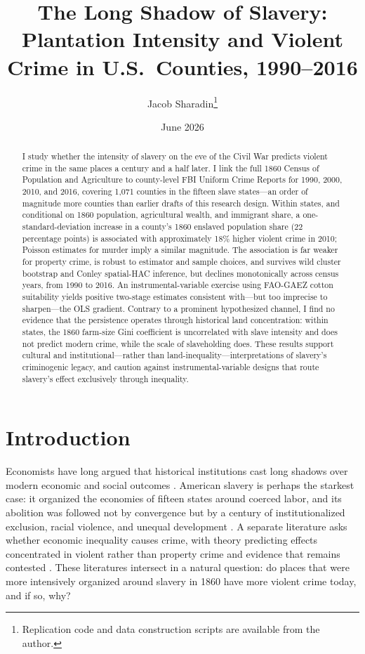 \documentclass[12pt]{article}
\title{\textbf{The Long Shadow of Slavery: Plantation Intensity and Violent Crime in U.S.\ Counties, 1990--2016}\\[0.6em]
\large}
\author{Jacob Sharadin\thanks{Replication code and data construction scripts are available from the author.}}
\date{June 2026}
\begin{document}
\maketitle

\begin{abstract}
\noindent I study whether the intensity of slavery on the eve of the Civil War predicts violent crime in the same places a century and a half later. I link the full 1860 Census of Population and Agriculture to county-level FBI Uniform Crime Reports for 1990, 2000, 2010, and 2016, covering 1,071 counties in the fifteen slave states---an order of magnitude more counties than earlier drafts of this research design. Within states, and conditional on 1860 population, agricultural wealth, and immigrant share, a one-standard-deviation increase in a county's 1860 enslaved population share (22 percentage points) is associated with approximately 18\% higher violent crime in 2010; Poisson estimates for murder imply a similar magnitude. The association is far weaker for property crime, is robust to estimator and sample choices, and survives wild cluster bootstrap and Conley spatial-HAC inference, but declines monotonically across census years, from 1990 to 2016. An instrumental-variable exercise using FAO-GAEZ cotton suitability yields positive two-stage estimates consistent with---but too imprecise to sharpen---the OLS gradient. Contrary to a prominent hypothesized channel, I find no evidence that the persistence operates through historical land concentration: within states, the 1860 farm-size Gini coefficient is uncorrelated with slave intensity and does not predict modern crime, while the scale of slaveholding does. These results support cultural and institutional---rather than land-inequality---interpretations of slavery's criminogenic legacy, and caution against instrumental-variable designs that route slavery's effect exclusively through inequality.
\end{abstract}

\vspace{1em}

\newpage

\section{Introduction}

Economists have long argued that historical institutions cast long shadows over modern economic and social outcomes \citep{acemoglu2001, dell2010, nunn2008qje}. American slavery is perhaps the starkest case: it organized the economies of fifteen states around coerced labor, and its abolition was followed not by convergence but by a century of institutionalized exclusion, racial violence, and unequal development \citep{foner1988, sacerdote2005, oconnell2012}. A separate literature asks whether economic inequality causes crime, with theory predicting effects concentrated in violent rather than property crime and evidence that remains contested \citep{becker1968, kelly2000, fajnzylber2002, pazzona2024}. These literatures intersect in a natural question: do places that were more intensively organized around slavery in 1860 have more violent crime today, and if so, why?
\end{document}
